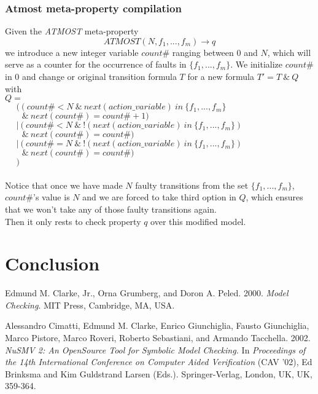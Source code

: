 \documentclass[12pt]{article}
\begin{document}
\subsubsection*{Atmost meta-property compilation}
Given the \textit{ATMOST} meta-property $$ATMOST(N,f_1,...,f_m) \rightarrow q$$ we introduce a new integer variable $count\#$ ranging between $0$ and $N$, which will serve as a counter for the occurrence of faults in $\{f_1,...,f_m\}$. We initialize $count\#$ in $0$ and change or original transition formula $T$ for a new formula $T' = T~\&~Q$ with\\
$Q = $\\ 
$~~~~~~(~(~count\# < N~\&~next(action\_variable)~in~\{f_1,...,f_m\}$\\
$~~~~~~~~~\&~next(count\#)=count\#+1)$\\
$~~~~~~|~(~count\# < N~\&~!(next(action\_variable)~in~\{f_1,...,f_m\})$\\
$~~~~~~~~~\&~next(count\#)=count\#)$\\
$~~~~~~|~(~count\# = N~\&~!(next(action\_variable)~in~\{f_1,...,f_m\})$\\
$~~~~~~~~~\&~next(count\#)=count\#)$\\
$~~~~~~)$\\\\
Notice that once we have made $N$ faulty transitions from the set $\{f_1,...,f_m\}$, $count\#$'s value is $N$ and we are forced to take third option in $Q$, which ensures that we won't take any of those faulty transitions again.\\
Then it only rests to check property $q$ over this modified model.


\section{Conclusion}



%
%
\begin{thebibliography}{9}

    Edmund M. Clarke, Jr., Orna Grumberg, and Doron A. Peled. 2000.
    \emph{Model Checking}. MIT Press, Cambridge, MA, USA. 

    Alessandro Cimatti, Edmund M. Clarke, Enrico Giunchiglia, Fausto
    Giunchiglia, Marco Pistore, Marco Roveri, Roberto Sebastiani, and Armando
    Tacchella. 2002. \emph{NuSMV 2: An OpenSource Tool for Symbolic Model
    Checking.} In \emph{Proceedings of the 14th International Conference on
    Computer Aided Verification} (CAV '02), Ed Brinksma and Kim Guldstrand
    Larsen (Eds.). Springer-Verlag, London, UK, UK, 359-364. 

\end{thebibliography}
\end{document}
